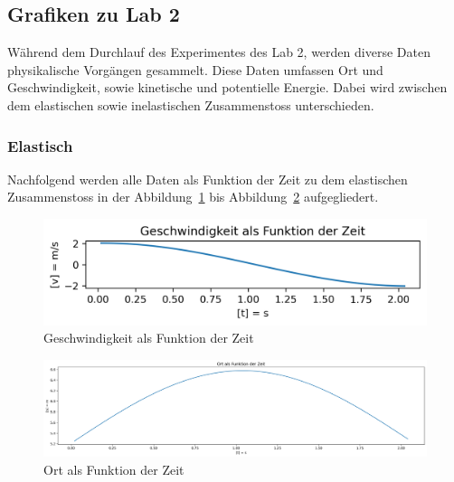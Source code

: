 \documentclass[../main.tex]{subfiles}
\begin{document}
    \subsection{Grafiken zu Lab 2}
    Während dem Durchlauf des Experimentes des Lab 2, werden diverse Daten physikalische Vorgängen
    gesammelt. Diese Daten umfassen Ort und Geschwindigkeit, sowie kinetische und potentielle Energie.
    Dabei wird zwischen dem elastischen sowie inelastischen Zusammenstoss unterschieden.
    \subsubsection{Elastisch}
    Nachfolgend werden alle Daten als Funktion der Zeit zu dem elastischen Zusammenstoss in der
    Abbildung~\ref{fig:GeschwindigkeitAlsFunktionDerZeit} bis Abbildung~\ref{fig:OrtAlsFunktionDerZeit}
    aufgegliedert.

    \begin{figure}[H]
        \begin{center}
            \centerline{\includegraphics[width=155mm]{./images/Elastisch/GeschwindigkeitAlsFunktionDerZeit}}
            \caption{Geschwindigkeit als Funktion der Zeit}
            \label{fig:GeschwindigkeitAlsFunktionDerZeit}
        \end{center}
    \end{figure}

    \begin{figure}[H]
        \begin{center}
            \centerline{\includegraphics[width=155mm]{./images/Elastisch/OrtAlsFunktionDerZeit}}
            \caption{Ort als Funktion der Zeit}
            \label{fig:OrtAlsFunktionDerZeit}
        \end{center}
    \end{figure}
\end{document}

